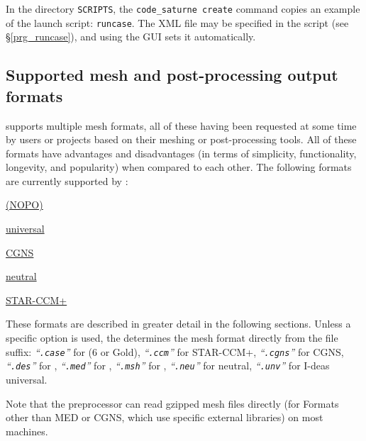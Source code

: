 {{{In the directory \texttt{SCRIPTS}, the \texttt{code\_saturne~create} command copies an example of the launch script: \texttt{runcase}.
The XML file may be specified in the script (see \S\ref{prg_runcase}),
and using the GUI sets it automatically.

\smallskip \noindent

\subsection{Supported mesh and post-processing output formats
\label{sec:formats}}

\CS supports multiple mesh formats, all of these having been requested
at some time by users or projects based on their meshing or post-processing
tools. All of these formats have advantages and disadvantages (in terms
of simplicity, functionality, longevity, and popularity) when compared to
each other. The following formats are currently supported by \CS:

\begin{list}{-}{}

\item \hyperref[fmtdesc:des]{\simail (NOPO)}
\item \hyperref[fmtdesc:unv]{\ideas universal}
\item \hyperref[fmtdesc:med]{\med}
\item \hyperref[fmtdesc:cgns]{CGNS}
\item \hyperref[fmtdesc:ensight6]{}
\item \hyperref[fmtdesc:ensightg]{\ensightg}
\item \hyperref[fmtdesc:neu]{\gambit neutral}
\item \hyperref[fmtdesc:gmsh]{\gmsh}
\item \hyperref[fmtdesc:ccm]{STAR-CCM+}
\end{list}

These formats are described in greater detail in the following sections.
Unless a specific option is used, the \pcs determines the mesh format directly
from the file suffix: %
{\em``\texttt{.case}''} for \ensight (6 or Gold),
{\em``\texttt{.ccm}''} for STAR-CCM+,
{\em``\texttt{.cgns}''} for CGNS,
{\em``\texttt{.des}''} for \simail,
{\em``\texttt{.med}''} for \med,
{\em``\texttt{.msh}''} for \gmsh,
{\em``\texttt{.neu}''} for \gambit neutral,
{\em``\texttt{.unv}''} for I-deas universal.

Note that the preprocessor can read gzipped mesh files directly (for Formats
other than MED or CGNS, which use specific external libraries) on most machines.

}}}
